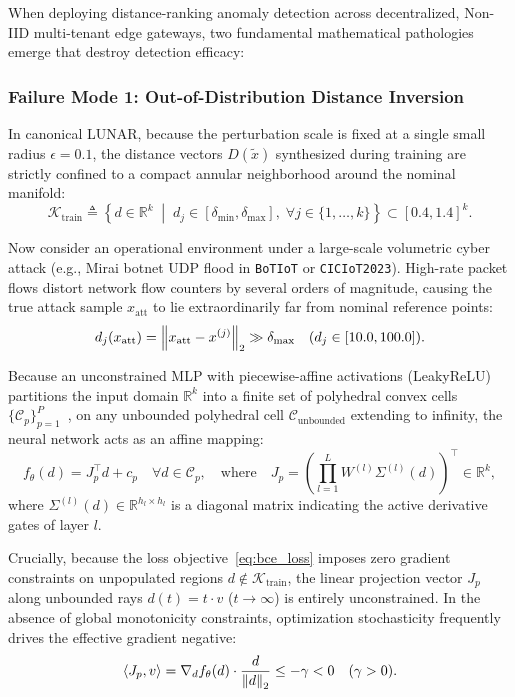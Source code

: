 When deploying distance-ranking anomaly detection across decentralized, Non-IID multi-tenant edge gateways, two fundamental mathematical pathologies emerge that destroy detection efficacy:

\subsubsection{Failure Mode 1: Out-of-Distribution Distance Inversion}
In canonical LUNAR, because the perturbation scale is fixed at a single small radius $\epsilon = 0.1$, the distance vectors $D(\tilde{x})$ synthesized during training are strictly confined to a compact annular neighborhood around the nominal manifold:
\begin{equation}
\label{eq:train_support}
\mathcal{K}_{\text{train}} \triangleq \left\{ d \in \mathbb{R}^k \;\middle|\; d_j \in [\delta_{\min}, \delta_{\max}], \; \forall j \in \{1, \dots, k\} \right\} \subset [0.4, 1.4]^k.
\end{equation}

Now consider an operational environment under a large-scale volumetric cyber attack (e.g., Mirai botnet UDP flood in \texttt{BoTIoT} or \texttt{CICIoT2023}). High-rate packet flows distort network flow counters by several orders of magnitude, causing the true attack sample $x_{\text{att}}$ to lie extraordinarily far from nominal reference points:
\begin{equation}
d_j(x_{\text{att}}) = \left\lVert x_{\text{att}} - x^{(j)}\right\rVert_2 \gg \delta_{\max} \quad (d_j \in [10.0, 100.0]).
\end{equation}

Because an unconstrained MLP with piecewise-affine activations (LeakyReLU) partitions the input domain $\mathbb{R}^k$ into a finite set of polyhedral convex cells $\{\mathcal{C}_p\}_{p=1}^P$~\cite{arora2018understanding}, on any unbounded polyhedral cell $\mathcal{C}_{\text{unbounded}}$ extending to infinity, the neural network acts as an affine mapping:
\begin{equation}
f_\theta(d) = J_p^\top d + c_p \quad \forall d \in \mathcal{C}_p, \quad \text{where} \quad J_p = \left( \prod_{l=1}^L W^{(l)} \Sigma^{(l)}(d) \right)^\top \in \mathbb{R}^k,
\end{equation}
where $\Sigma^{(l)}(d) \in \mathbb{R}^{h_l \times h_l}$ is a diagonal matrix indicating the active derivative gates of layer $l$.

Crucially, because the loss objective~\eqref{eq:bce_loss} imposes zero gradient constraints on unpopulated regions $d \notin \mathcal{K}_{\text{train}}$, the linear projection vector $J_p$ along unbounded rays $d(t) = t \cdot v$ ($t \to \infty$) is entirely unconstrained. In the absence of global monotonicity constraints, optimization stochasticity frequently drives the effective gradient negative:
\begin{equation}
\label{eq:inversion_condition}
\left\langle J_p,v\right\rangle = \nabla_d f_\theta(d) \cdot \frac{d}{\left\lVert d\right\rVert_2} \le -\gamma < 0 \quad (\gamma > 0).
\end{equation}

